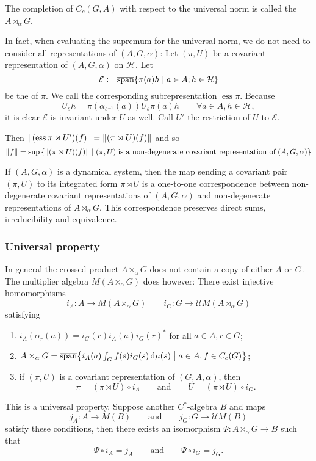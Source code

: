 The completion of $C_c(G,A)$ with respect to the universal norm is called the  $A \rtimes_\alpha G$.

In fact, when evaluating the supremum for the universal norm, we do not need to consider all representations of $(A,G,\alpha)$: Let $(\pi, U)$ be a covariant representation of $(A,G,\alpha)$ on $\mathcal{H}$. Let 
\[ \mathcal{E} \defeq \overline{\Span}\setbuilder{\pi(a)h}{a\in A; h\in \mathcal{H}} \]
be the  of $\pi$. We call the corresponding subrepresentation $\operatorname{ess} \pi$. Because
\[ U_s h =  \pi(\alpha_{s^{-1}}(a))U_s\pi(a) h \qquad \forall a\in A, h\in\mathcal{H}, \]
it is clear $\mathcal{E}$ is invariant under $U$ as well. Call $U'$ the restriction of $U$ to $\mathcal{E}$.

Then $\lVert(\operatorname{ess}\pi\rtimes U')(f)\rVert = \lVert(\pi\rtimes U)(f)\rVert$ and so
\[ \norm{f} =\sup\setbuilder{\norm{(\pi\rtimes U)(f)}}{(\pi, U)\;\text{is a non-degenerate covariant representation of} \; (A,G,\alpha)} \]

\begin{proposition}
If $(A,G,\alpha)$ is a dynamical system, then the map sending
a covariant pair $(\pi, U)$ to its integrated form $\pi\rtimes U$ is a one-to-one correspondence
between non-degenerate covariant representations of $(A, G, \alpha)$ and non-degenerate
representations of $A\rtimes_\alpha G$. This correspondence preserves direct sums, irreducibility
and equivalence.
\end{proposition}

\subsubsection{Universal property}

In general the crossed product $A\rtimes_\alpha G$ does not contain a copy of either $A$ or $G$. The multiplier algebra $M(A\rtimes_\alpha G)$ does however: There exist injective homomorphisms
\[ i_A: A\to M(A\rtimes_\alpha G) \qquad i_G: G\to \mathcal{U}M(A\rtimes_\alpha G) \]
satisfying
\begin{enumerate}
\item $i_A(\alpha_r(a)) = i_G(r)i_A(a)i_G(r)^*$ for all $a\in A, r\in G$;
\item $A \rtimes_\alpha G = \overline{\Span}\setbuilder{i_A(a)\int_Gf(s)i_G(s)\diff\mu(s)}{a\in A, f\in C_c(G)}$;
\item if $(\pi, U)$ is a covariant representation of $(G,A,\alpha)$, then
\[ \pi = (\pi\rtimes U)\circ i_A \qquad \text{and} \qquad U = (\pi \rtimes U)\circ i_G. \]
\end{enumerate}
This is a universal property. Suppose another $C^*$-algebra $B$ and maps
\[ j_A: A\to M(B) \qquad \text{and} \qquad j_G: G\to \mathcal{U}M(B) \]
satisfy these conditions, then there exists an isomorphism $\Psi: A\rtimes_\alpha G \to B$ such that
\[ \Psi \circ i_A = j_A \qquad \text{and} \qquad \Psi\circ i_G = j_G. \]

